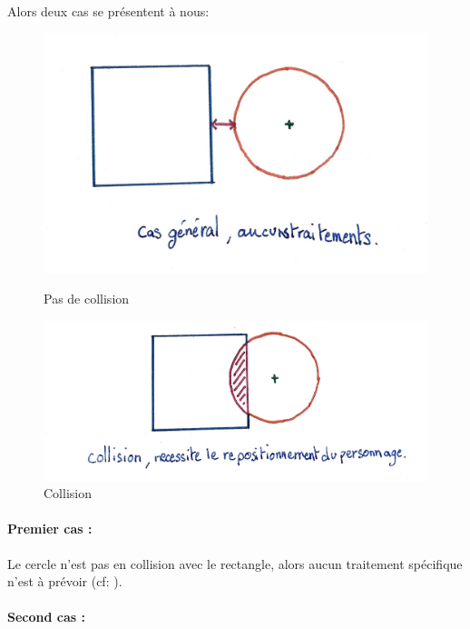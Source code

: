 \documentclass[11pt]{article}
\begin{document}
Alors deux cas se présentent à nous:

\begin{figure}
	\begin{minipage}{0.48\textwidth}
		\includegraphics[width=\linewidth]{image/fig2.jpg}
		\caption{Pas de collision}
		\label{fig:pas_de_collision}
	\end{minipage}
	\begin{minipage}{0.48\textwidth}
		\includegraphics[width=\linewidth]{image/fig3.jpg}
		\caption{Collision}
		\label{fig:collision}
	\end{minipage}
\end{figure}

\paragraph{Premier cas :} 

Le cercle n'est pas en collision avec le rectangle, alors aucun traitement spécifique n'est à prévoir (cf: ). 

\paragraph{Second cas :} 
\end{document}
